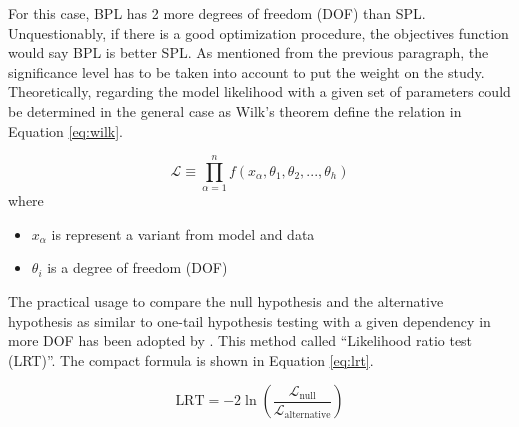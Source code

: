 For this case, BPL has 2 more degrees of freedom (DOF) than SPL.
Unquestionably, if there is a good optimization procedure, 
the objectives function would say BPL is better SPL. As mentioned 
from the previous paragraph, the significance level has to be taken
into account to put the weight on the study. Theoretically, regarding 
the model likelihood with a given set of parameters could be determined 
in the general case as Wilk's theorem define the relation in 
Equation \ref{eq:wilk}.

\begin{equation}
    \mathcal{L} \equiv \prod_{\alpha=1}^n f(x_\alpha, \theta_1, \theta_2, ..., \theta_h)
    \label{eq:wilk}
\end{equation}
where 
\begin{itemize}
    \item $x_\alpha$ is represent a variant from model and data
    \item $\theta_i$ is a degree of freedom (DOF)
\end{itemize}

The practical usage to compare the null hypothesis and the alternative 
hypothesis as similar to one-tail hypothesis testing with a given 
dependency in more DOF has been adopted by \cite{Huelsenbeck}.
This method called ``Likelihood ratio test (LRT)''. The compact formula 
is shown in Equation \ref{eq:lrt}.

\begin{equation}
    \text{LRT} = -2\ln\left(\frac{\mathcal{L}_\text{null}}{\mathcal{L}_\text{alternative}}\right)
    \label{eq:lrt}
\end{equation}








